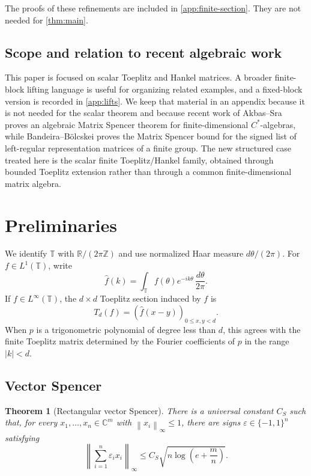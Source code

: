 \documentclass[11pt]{amsart}
\newtheorem{theorem}{Theorem}[section]
\theoremstyle{definition}
\newcommand{\C}{\mathbb C}
\newcommand{\R}{\mathbb R}
\newcommand{\T}{\mathbb T}
\newcommand{\eps}{\varepsilon}
\newcommand{\norm}[1]{\left\lVert #1\right\rVert}
\begin{document}
The proofs of these refinements are included in \cref{app:finite-section}.  They
are not needed for \cref{thm:main}.

\subsection{Scope and relation to recent algebraic work}

This paper is focused on scalar Toeplitz and Hankel matrices.  A broader
finite-block lifting language is useful for organizing related examples, and a
fixed-block version is recorded in \cref{app:lifts}.  We keep that material in
an appendix because it is not needed for the scalar theorem and because recent
work of Akbas--Sra \cite{AkbasSra2026} proves an algebraic Matrix Spencer
theorem for finite-dimensional $C^*$-algebras, while Bandeira--B{\"o}lcskei
\cite{BandeiraBolcskei2026} proves the Matrix Spencer bound for the signed list
of left-regular representation matrices of a finite group.  The new structured
case treated here is the scalar finite Toeplitz/Hankel family, obtained through
bounded Toeplitz extension rather than through a common finite-dimensional
matrix algebra.

\section{Preliminaries}\label{sec:prelim}

We identify $\T$ with $\R/(2\pi\mathbb Z)$ and use normalized Haar measure
$d\theta/(2\pi)$.  For $f\in L^1(\T)$, write
\[
   \widehat f(k)=\int_{\T} f(\theta)e^{-ik\theta}\,\frac{d\theta}{2\pi} .
\]
If $f\in L^\infty(\T)$, the $d\times d$ Toeplitz section induced by $f$ is
\[
   T_d(f)=(\widehat f(x-y))_{0\le x,y<d} .
\]
When $p$ is a trigonometric polynomial of degree less than $d$, this agrees with
the finite Toeplitz matrix determined by the Fourier coefficients of $p$ in the
range $|k|<d$.

\subsection{Vector Spencer}

\begin{theorem}[Rectangular vector Spencer]\label{thm:vector-spencer}
There is a universal constant $C_S$ such that, for every
$x_1,\ldots,x_n\in\C^m$ with $\norm{x_i}_\infty\le1$, there are signs
$\eps\in\{-1,1\}^n$ satisfying
\[
   \left\|\sum_{i=1}^n \eps_i x_i\right\|_\infty
   \le C_S\sqrt{n\log\!\left(e+\frac mn\right)} .
\]
\end{theorem}
\end{document}
